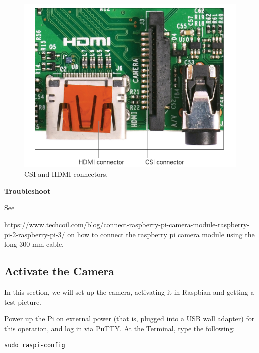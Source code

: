 \begin{figure}[!htb]
\begin{center}
\includegraphics[scale=0.280]{img/raspberrypi/raspberrypi_hdmi_csi.jpeg}
\end{center}
\caption{ CSI and HDMI connectors.}
\label{raspberrypi_hdmi_csi}
\end{figure}

\begin{framed}
\begin{remark}{\textbf{Troubleshoot}}


See 

\url{https:/​/​www.​techcoil.​com/​blog/​connect-​raspberry-​pi-​camera-​module-​raspberry-​pi-2-​raspberry-​pi-​3/}
on how to connect the raspberry pi camera module using the long 300 mm cable. 
\end{remark}
\end{framed}

\subsection{Activate the Camera}
\label{activate_camera}

In this section, we will set up the camera, activating it in Raspbian and getting a test
picture. 

Power up the Pi on external power (that is, plugged into a USB wall adapter) for this
operation,  and log in via PuTTY. At the Terminal, type the following:

\begin{lstlisting}
sudo raspi-config
\end{lstlisting}

